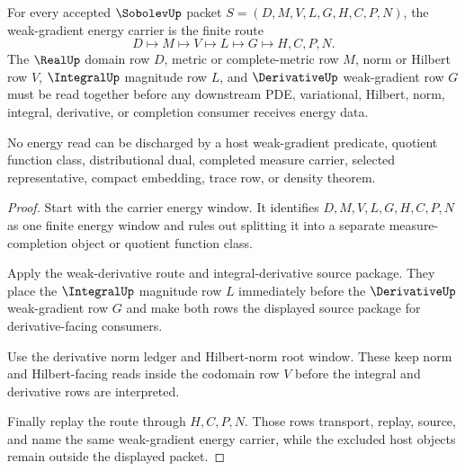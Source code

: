\begin{theorem}
\label{thm:sobolev-weak-gradient-energy-carrier}
For every accepted $\SobolevUp$ packet $S=(D,M,V,L,G,H,C,P,N)$, the weak-gradient energy carrier is the finite route
$$
D \longmapsto M \longmapsto V \longmapsto L \longmapsto G \longmapsto H,C,P,N .
$$
The $\RealUp$ domain row $D$, metric or complete-metric row $M$, norm or Hilbert row $V$, $\IntegralUp$ magnitude row $L$, and $\DerivativeUp$ weak-gradient row $G$ must be read together before any downstream PDE, variational, Hilbert, norm, integral, derivative, or completion consumer receives energy data.

No energy read can be discharged by a host weak-gradient predicate, quotient function class, distributional dual, completed measure carrier, selected representative, compact embedding, trace row, or density theorem.
\end{theorem}
\begin{proof}
Start with the carrier energy window. It identifies $D,M,V,L,G,H,C,P,N$ as one finite energy window and rules out splitting it into a separate measure-completion object or quotient function class.

Apply the weak-derivative route and integral-derivative source package. They place the $\IntegralUp$ magnitude row $L$ immediately before the $\DerivativeUp$ weak-gradient row $G$ and make both rows the displayed source package for derivative-facing consumers.

Use the derivative norm ledger and Hilbert-norm root window. These keep norm and Hilbert-facing reads inside the codomain row $V$ before the integral and derivative rows are interpreted.

Finally replay the route through $H,C,P,N$. Those rows transport, replay, source, and name the same weak-gradient energy carrier, while the excluded host objects remain outside the displayed packet.
\end{proof}

